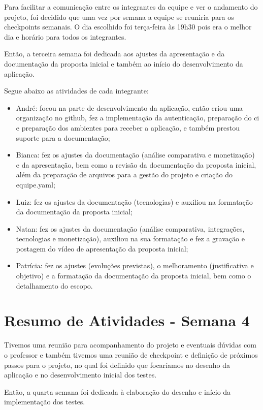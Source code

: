 \begin{apendicesenv}
Para facilitar a comunicação entre os integrantes da equipe e ver o andamento do projeto, foi decidido que uma vez por semana a equipe se reuniria para os \glspl{checkpoint} semanais. O dia escolhido foi terça-feira às 19h30 pois era o melhor dia e horário para todos os integrantes. 

Então, a terceira semana foi dedicada aos ajustes da apresentação e da documentação da proposta inicial e também ao início do desenvolvimento da aplicação.

Segue abaixo as atividades de cada integrante:

\begin{itemize}
\item André: focou na parte de desenvolvimento da aplicação, então criou uma organização no \gls{github}, fez a implementação da autenticação, preparação do \ac{ci} e preparação dos ambientes para receber a aplicação, e também prestou suporte para a documentação;
\item Bianca: fez os ajustes da documentação (análise comparativa e monetização) e da apresentação, bem como a revisão da documentação da proposta inicial, além da preparação de arquivos para a gestão do projeto e criação do equipe.yaml;
\item Luiz: fez os ajustes da documentação (tecnologias) e auxiliou na formatação da documentação da proposta inicial;
\item Natan: fez os ajustes da documentação (análise comparativa, integrações, tecnologias e monetização), auxiliou na sua formatação e fez a gravação e postagem do vídeo de apresentação da proposta inicial;
\item Patrícia: fez os ajustes (evoluções previstas), o melhoramento (justificativa e objetivo) e a formatação da documentação da proposta inicial, bem como o detalhamento do escopo.
\end{itemize}

\section{Resumo de Atividades - Semana 4}
Tivemos uma reunião para acompanhamento do projeto e eventuais dúvidas com o professor e também tivemos uma reunião de \gls{checkpoint} e definição de próximos passos para o projeto, no qual foi definido que focaríamos no desenho da aplicação e no desenvolvimento inicial dos testes.

Então, a quarta semana foi dedicada à elaboração do desenho e início da implementação dos testes. 


\end{apendicesenv}
